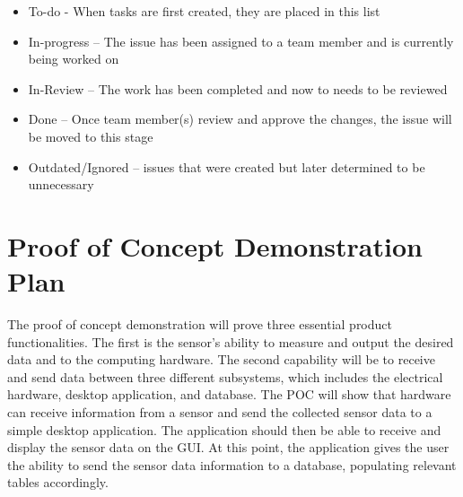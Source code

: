 \documentclass{article}
\begin{document}
\begin{itemize}
	\item To-do - When tasks are first created, they are placed in this list
	\item In-progress – The issue has been assigned to a team member and is currently being worked on
	\item In-Review – The work has been completed and now to needs to be reviewed
	\item Done – Once team member(s) review and approve the changes, the issue will be moved to this stage
	\item Outdated/Ignored – issues that were created but later determined to be unnecessary 
\end{itemize}

\section{Proof of Concept Demonstration Plan}

The proof of concept demonstration will prove three essential product
functionalities. The first is the sensor's ability to measure and output the  
desired data and to the computing hardware. The second capability will be to receive and send 
data between three different subsystems, which includes the electrical hardware, desktop application, and database. 
The POC will show that hardware can receive information from a sensor and send the collected sensor data 
to a simple desktop application. The application should then be able to receive and display the sensor 
data on the GUI. At this point, the application gives the user the ability to send the sensor data
information to a database, populating relevant tables accordingly. 
\end{document}
